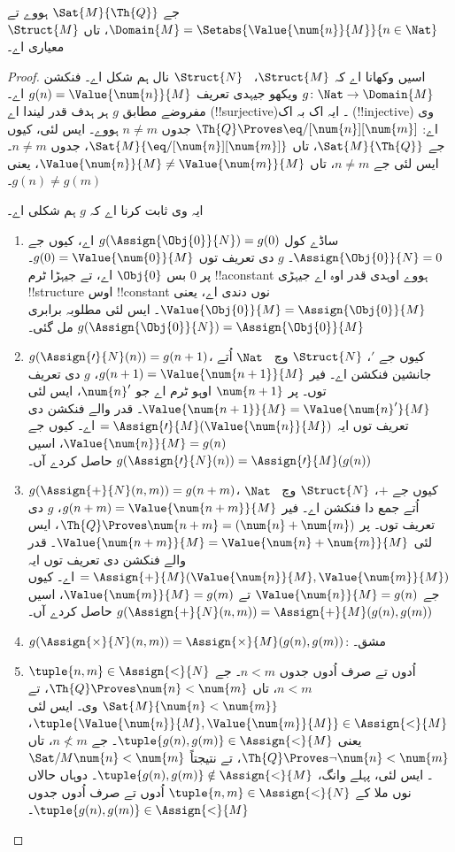 \documentclass[../../../include/open-logic-section]{subfiles}
\begin{document}
\begin{prop}
جے $\Sat{M}{\Th{Q}}$ ہووے تے
$\Domain{M} = \Setabs{\Value{\num{n}}{M}}{n
  \in \Nat}$، تاں $\Struct{M}$ معیاری اے۔
\end{prop}

\begin{proof}
اسیں وکھانا اے کہ $\Struct{M}$،
~$\Struct{N}$ نال ہم شکل اے۔ فنکشن
$g\colon \Nat \to \Domain{M}$ ویکھو جیہدی تعریف
$g(n) = \Value{\num{n}}{M}$ اے۔ مفروضے مطابق
$g$ ہر ہدف قدر لیندا اے (!!{surjective})۔ ایہ
اک بہ اک (!!{injective}) وی اے:
$\Th{Q} \Proves
\eq/[\num{n}][\num{m}]$ جدوں $n \neq m$
ہووے۔ ایس لئی، کیوں جے
$\Sat{M}{\Th{Q}}$، تاں
$\Sat{M}{\eq/[\num{n}][\num{m}]}$،
جدوں $n \neq m$۔ ایس لئی جے $n \neq m$، تاں
$\Value{\num{n}}{M} \neq
\Value{\num{m}}{M}$، یعنی $g(n) \neq g(m)$۔

ایہ وی ثابت کرنا اے کہ $g$ ہم شکلی اے۔
\begin{enumerate}
\item ساڈے کول $g(\Assign{\Obj{0}}{N}) = g(0)$ اے،
  کیوں جے $\Assign{\Obj{0}}{N} = 0$۔ $g$ دی تعریف توں
  $g(0) = \Value{\num{0}}{M}$۔ پر $\num{0}$
  بس $\Obj{0}$ اے، تے جیہڑا ٹرم !!a{constant} ہووے
  اوہدی قدر اوہ اے جیہڑی !!{structure} اوس
  !!{constant} نوں دندی اے، یعنی
  $\Value{\Obj{0}}{M} = \Assign{\Obj{0}}{M}$۔
  ایس لئی مطلوبہ برابری
  $g(\Assign{\Obj{0}}{N}) = \Assign{\Obj{0}}{M}$ مل گئی۔
\item $g(\Assign{\prime}{N}(n)) = g(n+1)$،
  کیوں جے $\prime$، $\Struct{N}$ وچ
  ~$\Nat$ اُتے جانشین فنکشن اے۔ فیر
  $g(n+1) = \Value{\num{n+1}}{M}$،
  $g$ دی تعریف توں۔
  پر $\num{n+1}$ اوہو ٹرم اے جو $\num{n}'$،
  ایس لئی $\Value{\num{n+1}}{M} =
  \Value{\num{n}'}{M}$۔ قدر والے فنکشن دی تعریف توں
  ایہ $= \Assign{\prime}{M}(\Value{\num{n}}{M})$ اے۔
  کیوں جے $\Value{\num{n}}{M} = g(n)$،
  اسیں $g(\Assign{\prime}{N}(n)) =
  \Assign{\prime}{M}(g(n))$ حاصل کردے آں۔
\item $g(\Assign{+}{N}(n,m)) = g(n+m)$،
  کیوں جے $+$، $\Struct{N}$ وچ
  ~$\Nat$ اُتے جمع دا فنکشن اے۔ فیر
  $g(n+m) = \Value{\num{n+m}}{M}$،
  $g$ دی تعریف توں۔
  پر $\Th{Q} \Proves
  \num{n+m} = (\num{n} + \num{m})$،
  ایس لئی $\Value{\num{n+m}}{M} =
  \Value{\num{n}+\num{m}}{M}$۔ قدر والے فنکشن دی
  تعریف توں ایہ $=
  \Assign{+}{M}(\Value{\num{n}}{M},\Value{\num{m}}{M})$
  اے۔ کیوں جے $\Value{\num{n}}{M} = g(n)$ تے
  $\Value{\num{m}}{M} = g(m)$، اسیں
  $g(\Assign{+}{N}(n, m)) = \Assign{+}{M}(g(n), g(m))$
  حاصل کردے آں۔
\item $g(\Assign{\times}{N}(n, m)) =
  \Assign{\times}{M}(g(n), g(m))$: مشق۔
\item $\tuple{n,m} \in \Assign{<}{N}$ اُدوں تے صرف اُدوں
  جدوں $n < m$۔ جے $n < m$، تاں
  $\Th{Q} \Proves \num{n} < \num{m}$،
  تے $\Sat{M}{\num{n} <
  \num{m}}$ وی۔ ایس لئی
  $\tuple{\Value{\num{n}}{M}, \Value{\num{m}}{M}} \in
  \Assign{<}{M}$، یعنی
  $\tuple{g(n), g(m)} \in \Assign{<}{M}$۔
  جے $n \not< m$، تاں
  $\Th{Q} \Proves \lnot \num{n} < \num{m}$،
  تے نتیجتاً $\Sat/{M}{\num{n} < \num{m}}$۔
  ایس لئی، پہلے وانگ،
  $\tuple{g(n), g(m)} \notin \Assign{<}{M}$۔
  دوہاں حالاں نوں ملا کے
  $\tuple{n,m} \in \Assign{<}{N}$
  اُدوں تے صرف اُدوں جدوں
  $\tuple{g(n), g(m)} \in
  \Assign{<}{M}$۔
\end{enumerate}
\end{proof}
\end{document}

